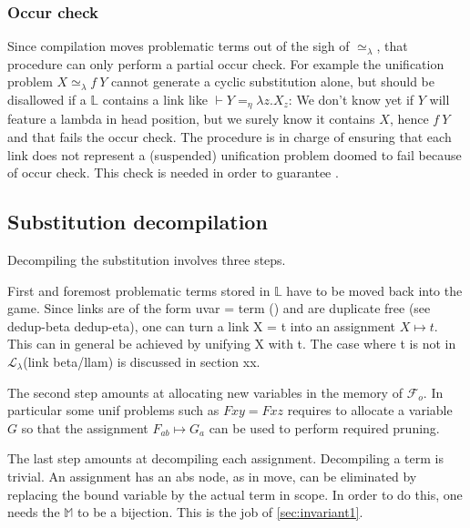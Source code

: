 \documentclass[sigconf,natbib=false,review]{acmart}
\newcommand{\UnifRel}{\ensuremath{\simeq}}
\newcommand{\Ue}{\ensuremath{\UnifRel_\lambda}\xspace}
\newcommand{\llambda}{\ensuremath{\mathcal{L}_\lambda}\xspace}
\newcommand{\Fo}{\ensuremath{\mathcal{F}_{\!o}\xspace}} %
\newcommand{\linketaM}[3]{\ensuremath{#1 \vdash #2 =_\eta #3}}
\newcommand{\linkStore}{\ensuremath{\mathbb{L}}\xspace}
\newcommand{\mapStore}{\ensuremath{\mathbb{M}}\xspace}
\begin{document}
\subsubsection{Occur check}
Since compilation moves problematic terms out of the sigh of \Ue{},
that procedure can only perform a partial occur check. For example the
unification problem $X \Ue f~Y$ cannot generate a cyclic substitution alone,
but should be disallowed if a $\linkStore$ contains a link like
$\linketaM{}{Y}{\lambda z.X_z}$: We don't know yet if $Y$ will feature
a lambda in head position, but we surely know it contains $X$, hence
$f~Y$ and that fails the occur check.
The procedure  is in charge of ensuring that
each link does not represent a (suspended) unification problem doomed
to fail because of occur check. This check is needed in order to
guarantee .

\subsection{Substitution decompilation}

Decompiling the substitution involves three steps.

First and foremost problematic terms stored in
\linkStore have to be moved back into the game.
Since links are of the form uvar = term ()
and are duplicate free (see dedup-beta dedup-eta),
one can turn a link X = t into an assignment $X \mapsto t$.
This can in general be achieved by unifying X with t. The case
where t is not in \llambda (link beta/llam) is discussed in section xx.

The second step amounts at allocating new variables in the
memory of \Fo{}. In particular some unif problems
such as $F x y = F x z$ requires to allocate a 
variable $G$ so that the assignment
$F_{ab} \mapsto G_a$ can be used to perform
required pruning.

The last step amounts at decompiling each assignment.
Decompiling a term is trivial. An assignment has an
abs node, as in move, can be eliminated by replacing
the bound variable by the actual term in scope.
In order to do this, one needs the \mapStore to be
a bijection. This is the job of \cref{sec:invariant1}.

\end{document}
